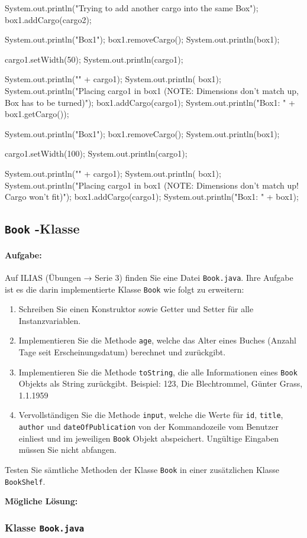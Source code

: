 \documentclass[a4paper,10pt, dvipsnames]{report}
\begin{document}
\begin{javacodebox}
{{        System.out.println("Trying to add another cargo into the same Box");
        box1.addCargo(cargo2);

        System.out.println("\nEmpty Box1");
        box1.removeCargo();
        System.out.println(box1);

        cargo1.setWidth(50);
        System.out.println(cargo1);

        System.out.println("\n" + cargo1);
        System.out.println( box1);
        System.out.println("Placing cargo1 in box1 (NOTE: Dimensions don't match up, Box has to be turned)");
        box1.addCargo(cargo1);
        System.out.println("Box1: " + box1.getCargo());

        System.out.println("\nEmpty Box1");
        box1.removeCargo();
        System.out.println(box1);

        cargo1.setWidth(100);
        System.out.println(cargo1);

        System.out.println("\n" + cargo1);
        System.out.println( box1);
        System.out.println("Placing cargo1 in box1 (NOTE: Dimensions don't match up! Cargo won't fit)");
        box1.addCargo(cargo1);
        System.out.println("Box1: " + box1);


    }
}
\end{javacodebox}

\subsection{\texttt{Book} -Klasse}

\paragraph{Aufgabe:}
Auf ILIAS (Übungen → Serie 3) finden Sie eine Datei \texttt{Book.java}. Ihre Aufgabe ist es die darin implementierte Klasse \texttt{Book} wie folgt zu erweitern:

\begin{enumerate}
    \item Schreiben Sie einen Konstruktor sowie Getter und Setter für alle Instanzvariablen.
    \item Implementieren Sie die Methode \texttt{age}, welche das Alter eines Buches (Anzahl Tage seit Erscheinungsdatum) berechnet und zurückgibt.
    \item Implementieren Sie die Methode \texttt{toString}, die alle Informationen eines \texttt{Book} Objekts als String zurückgibt. Beispiel: 123, Die Blechtrommel, Günter Grass, 1.1.1959
    \item Vervollständigen Sie die Methode \texttt{input}, welche die Werte für \texttt{id}, \texttt{title}, \texttt{author} und \texttt{dateOfPublication} von der Kommandozeile vom Benutzer einliest und im jeweiligen \texttt{Book} Objekt abspeichert. Ungültige Eingaben müssen Sie nicht abfangen.
\end{enumerate}

Testen Sie sämtliche Methoden der Klasse \texttt{Book} in einer zusätzlichen Klasse \texttt{BookShelf}.

\textbf{Mögliche Lösung:}

\subsubsection{Klasse \texttt{Book.java}}
\end{document}
